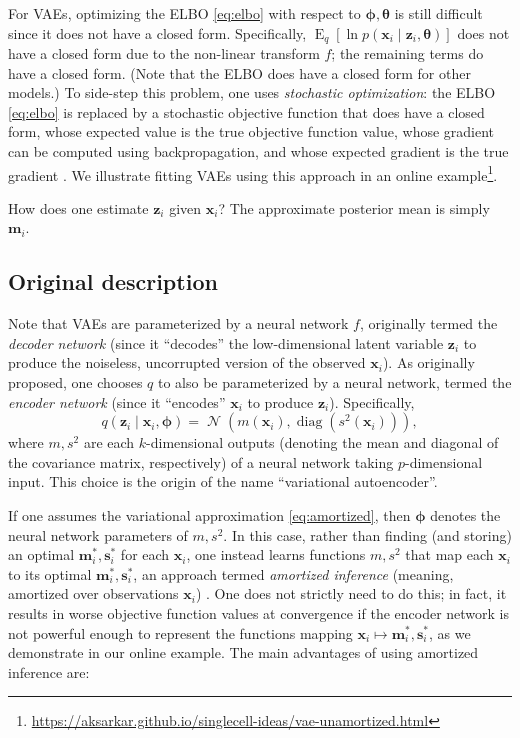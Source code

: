 \documentclass[reqno,11pt]{amsart}
\DeclareMathOperator\diag{diag}
\DeclareMathOperator\E{E}
\DeclareMathOperator\N{\mathcal{N}}
\newcommand\vm{\mathbf{m}}
\newcommand\vphi{\boldsymbol{\phi}}
\newcommand\vs{\mathbf{s}}
\newcommand\vtheta{\boldsymbol{\theta}}
\newcommand\vx{\mathbf{x}}
\newcommand\vz{\mathbf{z}}
\begin{document}
For VAEs, optimizing the ELBO \eqref{eq:elbo} with respect to $\vphi, \vtheta$
is still difficult since it does not have a closed form. Specifically,
$\E_q[\ln p(\vx_i \mid \vz_i, \vtheta)]$ does not have a closed form due to the
non-linear transform $f$; the remaining terms do have a closed form. (Note that
the ELBO does have a closed form for other models.) To side-step this problem,
one uses \emph{stochastic optimization}: the ELBO \eqref{eq:elbo} is replaced
by a stochastic objective function that does have a closed form, whose expected
value is the true objective function value, whose gradient can be computed
using backpropagation, and whose expected gradient is the true gradient
\cite{DBLP:journals/corr/KingmaW13}. We illustrate fitting VAEs using this
approach in an online
example\footnote{\url{https://aksarkar.github.io/singlecell-ideas/vae-unamortized.html}}.

How does one estimate $\vz_i$ given $\vx_i$? The approximate posterior mean is
simply $\vm_i$.

\subsection{Original description}

Note that VAEs are parameterized by a neural network $f$, originally termed the
\emph{decoder network} (since it ``decodes'' the low-dimensional latent
variable $\vz_i$ to produce the noiseless, uncorrupted version of the observed
$\vx_i$). As originally proposed, one chooses $q$ to also be parameterized by a
neural network, termed the \emph{encoder network} (since it ``encodes'' $\vx_i$
to produce $\vz_i$). Specifically,
%
\begin{equation}
  q(\vz_i \mid \vx_i, \vphi) = \N(m(\vx_i), \diag(s^2(\vx_i))),
  \label{eq:amortized}
\end{equation}
%
where $m, s^2$ are each $k$-dimensional outputs (denoting the mean and diagonal
of the covariance matrix, respectively) of a neural network taking
$p$-dimensional input. This choice is the origin of the name ``variational
autoencoder''.

If one assumes the variational approximation \eqref{eq:amortized}, then $\vphi$
denotes the neural network parameters of $m, s^2$. In this case, rather than
finding (and storing) an optimal $\vm_i^*, \vs_i^*$ for each $\vx_i$, one
instead learns functions $m, s^2$ that map each $\vx_i$ to its optimal
$\vm_i^*, \vs_i^*$, an approach termed \emph{amortized inference} (meaning,
amortized over observations $\vx_i$) \cite{Gershman2014}. One does not strictly
need to do this; in fact, it results in worse objective function values at
convergence if the encoder network is not powerful enough to represent the
functions mapping $\vx_i \mapsto \vm_i^*, \vs_i^*$, as we demonstrate in our
online example. The main advantages of using amortized inference are:
\end{document}
